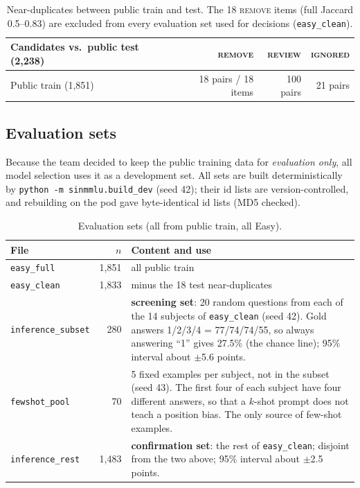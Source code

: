 \documentclass[10pt,a4paper]{article}
\begin{document}
\begin{table}[h]
\centering\small
\begin{tabular}{lrrr}
\toprule
Candidates vs.\ public test (2,238) & \textsc{remove} & \textsc{review} & \textsc{ignored}\\
\midrule
Public train (1,851) & 18 pairs / 18 items & 100 pairs & 21 pairs\\
\bottomrule
\end{tabular}
\caption{Near-duplicates between public train and test. The 18 \textsc{remove} items (full Jaccard 0.5--0.83) are
excluded from every evaluation set used for decisions (\texttt{easy\_clean}).}
\end{table}

\subsection{Evaluation sets}\label{sec:devsets}
Because the team decided to keep the public training data for \emph{evaluation only}, all model selection uses it as a
development set. All sets are built deterministically by \texttt{python -m sinmmlu.build\_dev} (seed 42); their id lists
are version-controlled, and rebuilding on the pod gave byte-identical id lists (MD5 checked).
\begin{table}[h]
\centering\small
\begin{tabularx}{\linewidth}{lrX}
\toprule
File & $n$ & Content and use\\
\midrule
\texttt{easy\_full} & 1,851 & all public train\\
\texttt{easy\_clean} & 1,833 & minus the 18 test near-duplicates\\
\texttt{inference\_subset} & 280 & \textbf{screening set}: 20 random questions from each of the 14 subjects of
\texttt{easy\_clean} (seed 42). Gold answers 1/2/3/4 = 77/74/74/55, so always answering ``1'' gives 27.5\%
(the chance line); 95\% interval about $\pm$5.6 points.\\
\texttt{fewshot\_pool} & 70 & 5 fixed examples per subject, not in the subset (seed 43). The first four of each subject
have four different answers, so that a $k$-shot prompt does not teach a position bias. The only source of few-shot
examples.\\
\texttt{inference\_rest} & 1,483 & \textbf{confirmation set}: the rest of \texttt{easy\_clean}; disjoint from the two
above; 95\% interval about $\pm$2.5 points.\\
\bottomrule
\end{tabularx}
\caption{Evaluation sets (all from public train, all Easy).}
\end{table}
\end{document}
